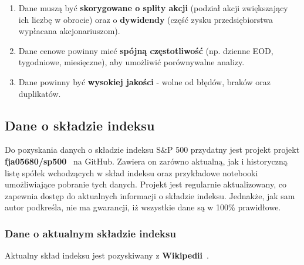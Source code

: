 \documentclass[12pt, a4paper]{article}
\begin{document}
\begin{enumerate}
    \item Dane muszą być \textbf{skorygowane o splity akcji} (podział akcji zwiększający ich liczbę w obrocie) oraz o \textbf{dywidendy} (część zysku przedsiębiorstwa wypłacana akcjonariuszom).

    \item Dane cenowe powinny mieć \textbf{spójną częstotliwość} (np. dzienne EOD, tygodniowe, miesięczne), aby umożliwić porównywalne analizy.

    \item Dane powinny być \textbf{wysokiej jakości} - wolne od błędów, braków oraz duplikatów.
\end{enumerate}

\subsection{Dane o składzie indeksu}

Do pozyskania danych o składzie indeksu S\&P 500 przydatny jest projekt projekt \textbf{fja05680/sp500}~\cite{github:sp500} na GitHub. Zawiera on zarówno aktualną, jak i historyczną listę spółek wchodzących w skład indeksu oraz przykładowe notebooki umożliwiające pobranie tych danych. Projekt jest regularnie aktualizowany, co zapewnia dostęp do aktualnych informacji o składzie indeksu. Jednakże, jak sam autor podkreśla, nie ma gwarancji, iż wszystkie dane są w 100\% prawidłowe.

\subsubsection{Dane o aktualnym składzie indeksu}

Aktualny skład indeksu jest pozyskiwany z \textbf{Wikipedii}~\cite{wiki:sp500_list}.

\begin{table}[H]
\centering
\caption{Fragment danych o spółkach wchodzących w skład indeksu S\&P 500.}
\label{tab:sp500_companies}
\end{table}
\end{document}
